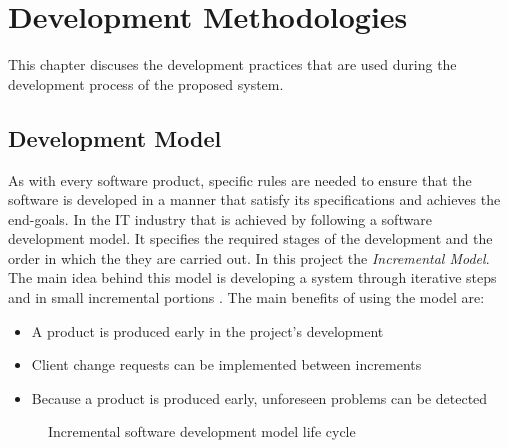 \chapter{Development Methodologies}
This chapter discuses the development practices that are used during the development process of the proposed system.  

\section{Development Model}
\label{section:development-model}
As with every software product, specific rules are needed to ensure that the software is developed in a manner that satisfy its specifications and achieves the end-goals. In the IT industry that is achieved by following a software development model. It specifies the required stages of the development and the order in which the they are carried out. In this project the \textit{Incremental Model}. The main idea behind this model is developing a system through iterative steps and in small incremental portions \citep[264]{bhuvaneswari2013}. The main benefits of using the model are:

\begin{itemize}
    \item A product is produced early in the project's development
    \item Client change requests can be implemented between increments
    \item Because a product is produced early, unforeseen problems can be detected
\end{itemize}

    \begin{figure}[H]
        \centering
        \caption{Incremental software development model life cycle}
        \label{fig:incremental-model}
    \end{figure}


